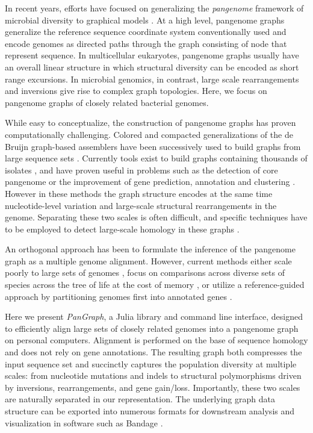 \documentclass[aps,rmp,preprint,superscriptaddress,10pt,linenumbers]{revtex4-1}
\begin{document}
In recent years, efforts have focused on generalizing the \emph{pangenome} framework of microbial diversity to graphical models \cite{eizenga2020pangenome}.
At a high level, pangenome graphs generalize the reference sequence coordinate system conventionally used and encode genomes as directed paths through the graph consisting of node that represent sequence.
In multicellular eukaryotes, pangenome graphs usually have an overall linear structure in which structural diversity can be encoded as short range  excursions.
In microbial genomics, in contrast, large scale rearrangements and inversions give rise to complex graph topologies.
Here, we focus on pangenome graphs of closely related bacterial genomes.

While easy to conceptualize, the construction of pangenome graphs has proven computationally challenging.
Colored and compacted generalizations of the de Bruijn graph-based assemblers have been successively used to build graphs from large sequence sets \cite{iqbal2012novo,muggli2017succinct}. Currently tools exist to build graphs containing thousands of isolates \cite{holley2020bifrost}, and have proven useful in problems such as the detection of core pangenome \cite{schulz2022sequence} or the improvement of gene prediction, annotation and clustering \cite{horsfield2023accurate}. However in these methods the graph structure encodes at the same time nucleotide-level variation and large-scale structural rearrangements in the genome. Separating these two scales is often difficult, and specific techniques have to be employed to detect large-scale homology in these graphs \cite{angiuoli2011mugsy,minkin2013sibelia}.

An orthogonal approach has been to formulate the inference of the pangenome graph as a multiple genome alignment.
However, current methods either scale poorly to large sets of genomes \cite{darling2010progressivemauve}, focus on comparisons across diverse sets of species across the tree of life at the cost of memory \cite{armstrong2020progressive}, or utilize a reference-guided approach by partitioning genomes first into annotated genes \cite{gautreau2020ppanggolin,colquhoun2021pandora}.

Here we present \emph{PanGraph}, a Julia \cite{bezanson2017julia} library and command line interface, designed to efficiently align large sets of closely related genomes into a pangenome graph on personal computers. Alignment is performed on the base of sequence homology and does not rely on gene annotations.
The resulting graph both compresses the input sequence set and succinctly captures the population diversity at multiple scales: from nucleotide mutations and indels to structural polymorphisms driven by inversions, rearrangements, and gene gain/loss. Importantly, these two scales are naturally separated in our representation.
The underlying graph data structure can be exported into numerous formats for downstream analysis and visualization in software such as Bandage \cite{wick2015bandage}.
\end{document}
